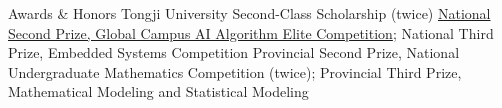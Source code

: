 
\begin{rubric}{Awards \& Honors}
\entry*[2024, 2025]
  Tongji University Second-Class Scholarship (twice)
\entry*[2025]
  \href{../../2025_AIC_Award.pdf}{National Second Prize, Global Campus AI Algorithm Elite Competition}; National Third Prize, Embedded Systems Competition
\entry*[2025]
  Provincial Second Prize, National Undergraduate Mathematics Competition (twice); Provincial Third Prize, Mathematical Modeling and Statistical Modeling
\end{rubric}
